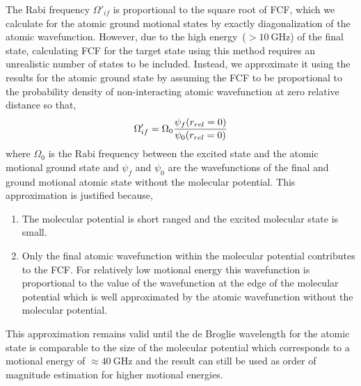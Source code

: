 The Rabi frequency $\Omega'_{if}$ is proportional to the square root of FCF,
which we calculate for the atomic ground motional states by exactly diagonalization
of the atomic wavefunction.
However, due to the high energy~($>\!10~\mathrm{GHz}$) of the final state,
calculating FCF for the target state using this method requires an unrealistic number of
states to be included.
Instead, we approximate it using the results for the atomic ground state
by assuming the FCF to be proportional to the probability density of non-interacting
atomic wavefunction at zero relative distance so that,
\[
  \Omega'_{if}=\Omega_0\frac{\psi_f{\left({r_{rel}=0}\right)}}{\psi_0{\left({r_{rel}=0}\right)}}
\]
where $\Omega_0$ is the Rabi frequency between the excited state and
the atomic motional ground state and $\psi_f$ and $\psi_0$ are the
wavefunctions of the final and ground motional atomic state without the molecular potential.
This approximation is justified because,
\begin{enumerate}
\item The molecular potential is short ranged and the excited molecular state is small.
\item Only the final atomic wavefunction within the molecular potential contributes to the FCF.
  For relatively low motional energy
  this wavefunction is proportional to the value of the wavefunction at
  the edge of the molecular potential which is well approximated by
  the atomic wavefunction without the molecular potential.
\end{enumerate}
This approximation remains valid until the de Broglie wavelength for the atomic state
is comparable to the size of the molecular potential which corresponds to
a motional energy of $\approx\!40~\mathrm{GHz}$
and the result can still be used as order of magnitude estimation for higher motional energies.

